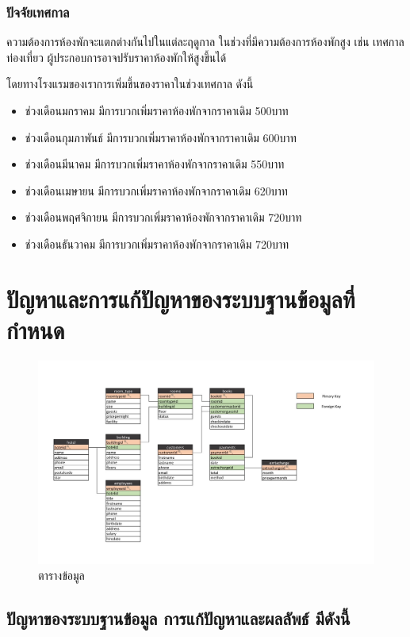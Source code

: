 \documentclass{report}
\begin{document}
\subsection{ปัจจัยเทศกาล}
ความต้องการห้องพักจะแตกต่างกันไปในแต่ละฤดูกาล ในช่วงที่มีความต้องการห้องพักสูง เช่น เทศกาลท่องเที่ยว ผู้ประกอบการอาจปรับราคาห้องพักให้สูงขึ้นได้ \par
โดยทางโรงแรมของเราการเพิ่มขึ้นของราคาในช่วงเทศกาล ดังนี้
\begin{itemize}
    \item{ช่วงเดือนมกราคม มีการบวกเพิ่มราคาห้องพักจากราคาเดิม 500บาท}
    \item{ช่วงเดือนกุมภาพันธ์ มีการบวกเพิ่มราคาห้องพักจากราคาเดิม 600บาท}
    \item{ช่วงเดือนมีนาคม มีการบวกเพิ่มราคาห้องพักจากราคาเดิม 550บาท}
    \item{ช่วงเดือนเมษายน มีการบวกเพิ่มราคาห้องพักจากราคาเดิม 620บาท}
    \item{ช่วงเดือนพฤศจิกายน มีการบวกเพิ่มราคาห้องพักจากราคาเดิม 720บาท}
    \item{ช่วงเดือนธันวาคม มีการบวกเพิ่มราคาห้องพักจากราคาเดิม 720บาท}
\end{itemize}


\chapter{ปัญหาและการแก้ปัญหาของระบบฐานข้อมูลที่กำหนด}

\begin{figure}[h!]
\centering
\includegraphics[scale=0.25]{diagram.jpg}
\caption{ตารางข้อมูล} 
\label{fig:graph12}
\end{figure} 

\pagebreak

\section{ปัญหาของระบบฐานข้อมูล การแก้ปัญหาและผลลัพธ์ มีดังนี้}
\end{document}
